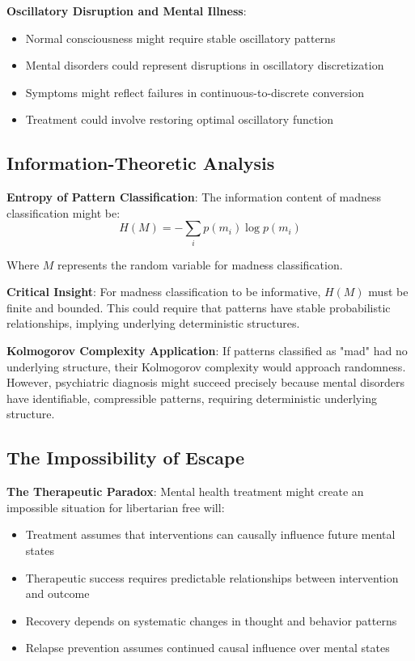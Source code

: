 \documentclass[12pt]{article}
\begin{document}
\textbf{Oscillatory Disruption and Mental Illness}:
\begin{itemize}
\item Normal consciousness might require stable oscillatory patterns
\item Mental disorders could represent disruptions in oscillatory discretization
\item Symptoms might reflect failures in continuous-to-discrete conversion
\item Treatment could involve restoring optimal oscillatory function
\end{itemize}

\subsection{Information-Theoretic Analysis}

\textbf{Entropy of Pattern Classification}: The information content of madness classification might be:
$$H(M) = -\sum_i p(m_i) \log p(m_i)$$

Where $M$ represents the random variable for madness classification.

\textbf{Critical Insight}: For madness classification to be informative, $H(M)$ must be finite and bounded. This could require that patterns have stable probabilistic relationships, implying underlying deterministic structures.

\textbf{Kolmogorov Complexity Application}: If patterns classified as "mad" had no underlying structure, their Kolmogorov complexity would approach randomness. However, psychiatric diagnosis might succeed precisely because mental disorders have identifiable, compressible patterns, requiring deterministic underlying structure.

\subsection{The Impossibility of Escape}

\textbf{The Therapeutic Paradox}: Mental health treatment might create an impossible situation for libertarian free will:
\begin{itemize}
\item Treatment assumes that interventions can causally influence future mental states
\item Therapeutic success requires predictable relationships between intervention and outcome
\item Recovery depends on systematic changes in thought and behavior patterns
\item Relapse prevention assumes continued causal influence over mental states
\end{itemize}
\end{document}
